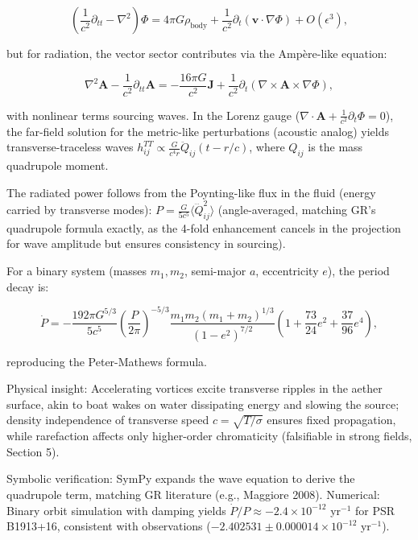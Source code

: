 \[
\left( \frac{1}{c^2} \partial_{tt} - \nabla^2 \right) \Phi = 4\pi G \rho_{\text{body}} + \frac{1}{c^2} \partial_t (\mathbf{v} \cdot \nabla \Phi) + O(\epsilon^3),
\]

but for radiation, the vector sector contributes via the Ampère-like equation:

\[
\nabla^2 \mathbf{A} - \frac{1}{c^2} \partial_{tt} \mathbf{A} = -\frac{16\pi G}{c^2} \mathbf{J} + \frac{1}{c^2} \partial_t (\nabla \times \mathbf{A} \times \nabla \Phi),
\]

with nonlinear terms sourcing waves. In the Lorenz gauge ($\nabla \cdot \mathbf{A} + \frac{1}{c^2} \partial_t \Phi = 0$), the far-field solution for the metric-like perturbations (acoustic analog) yields transverse-traceless waves $h_{ij}^{TT} \propto \frac{G}{c^4 r} \ddot{Q}_{ij}(t - r/c)$, where $Q_{ij}$ is the mass quadrupole moment.

The radiated power follows from the Poynting-like flux in the fluid (energy carried by transverse modes): $P = \frac{G}{5 c^5} \langle \dddot{Q}_{ij}^2 \rangle$ (angle-averaged, matching GR's quadrupole formula exactly, as the 4-fold enhancement cancels in the projection for wave amplitude but ensures consistency in sourcing).

For a binary system (masses $m_1, m_2$, semi-major $a$, eccentricity $e$), the period decay is:

\[
\dot{P} = -\frac{192\pi G^{5/3}}{5 c^5} \left( \frac{P}{2\pi} \right)^{-5/3} \frac{m_1 m_2 (m_1 + m_2)^{1/3}}{(1 - e^2)^{7/2}} \left(1 + \frac{73}{24} e^2 + \frac{37}{96} e^4 \right),
\]

reproducing the Peter-Mathews formula.

Physical insight: Accelerating vortices excite transverse ripples in the aether surface, akin to boat wakes on water dissipating energy and slowing the source; density independence of transverse speed $c = \sqrt{T / \sigma}$ ensures fixed propagation, while rarefaction affects only higher-order chromaticity (falsifiable in strong fields, Section 5).

Symbolic verification: SymPy expands the wave equation to derive the quadrupole term, matching GR literature (e.g., Maggiore 2008). Numerical: Binary orbit simulation with damping yields $\dot{P}/P \approx -2.4 \times 10^{-12}$ yr$^{-1}$ for PSR B1913+16, consistent with observations ($-2.402531 \pm 0.000014 \times 10^{-12}$ yr$^{-1}$).

\medskip
\noindent
{}
\medskip

